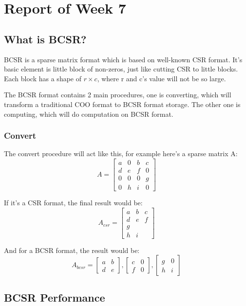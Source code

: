 
\section{Report of Week 7}

\subsection{What is BCSR?}
BCSR is a sparse matrix format which is based on well-known CSR format. It's basic element is little block of non-zeros, just like cutting CSR to little blocks. Each block has a shape of $r \times c$, where r and c's value will not be so large. 

The BCSR format contains 2 main procedures, one is converting, which will transform a traditional COO format to BCSR format storage. The other one is computing, which will do computation on BCSR format.

\subsubsection{Convert}
The convert procedure will act like this, for example here's a sparse matrix A:
\[
A = 
\begin{bmatrix}
	a & 0 & b & c \\
	d & e & f & 0 \\
	0 & 0 & 0 & g \\
	0 & h & i & 0
\end{bmatrix}
\]

If it's a CSR format, the final result would be:
\[
A_{csr} = 
\begin{bmatrix}
	a & b & c \\
	d & e & f \\
	g \\
	h & i
\end{bmatrix}
\]

And for a BCSR format, the result would be:
\[
A_{bcsr} =
\begin{bmatrix}
	a & b\\
	d & e
\end{bmatrix}
,
\begin{bmatrix}
	c & 0\\
	f & 0
\end{bmatrix}
,
\begin{bmatrix}
	g & 0\\
	h & i
\end{bmatrix}
\]

\subsection{BCSR Performance}

